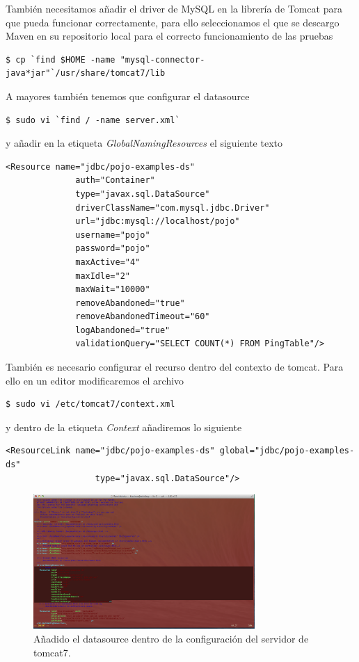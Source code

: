 \documentclass{article}
\begin{document}
También necesitamos añadir el driver de MySQL en la librería de Tomcat para que pueda funcionar correctamente, para ello seleccionamos el que se descargo Maven en su repositorio local para el correcto funcionamiento de las pruebas
\begin{lstlisting}[style=miniBash]
$ cp `find $HOME -name "mysql-connector-java*jar"`/usr/share/tomcat7/lib
\end{lstlisting}	

A mayores también tenemos que configurar el datasource
\begin{lstlisting}[style=miniBash]
$ sudo vi `find / -name server.xml`
\end{lstlisting}	
y añadir en la etiqueta \emph{GlobalNamingResources} el siguiente texto
\begin{lstlisting}[style=xml]
    <Resource name="jdbc/pojo-examples-ds"
              auth="Container"
              type="javax.sql.DataSource"
              driverClassName="com.mysql.jdbc.Driver"
              url="jdbc:mysql://localhost/pojo"
              username="pojo"
              password="pojo"
              maxActive="4"
              maxIdle="2"
              maxWait="10000"
              removeAbandoned="true"
              removeAbandonedTimeout="60"
              logAbandoned="true"
              validationQuery="SELECT COUNT(*) FROM PingTable"/>
\end{lstlisting}

También es necesario configurar el recurso dentro del contexto de tomcat. Para ello en un editor modificaremos el archivo
\begin{lstlisting}[style=miniBash]
$ sudo vi /etc/tomcat7/context.xml
\end{lstlisting}	
y dentro de la etiqueta \emph{Context} añadiremos lo siguiente
\begin{lstlisting}[style=xml]
    <ResourceLink name="jdbc/pojo-examples-ds" global="jdbc/pojo-examples-ds"
                  type="javax.sql.DataSource"/>
\end{lstlisting}	

\begin{figure}[h]
  \centering
    \includegraphics[width=0.75\textwidth]{img/p022.png}
  \caption{Añadido el datasource dentro de la configuración del servidor de tomcat7.}
  \label{fig:tomcatDatasource}
\end{figure}
\end{document}
